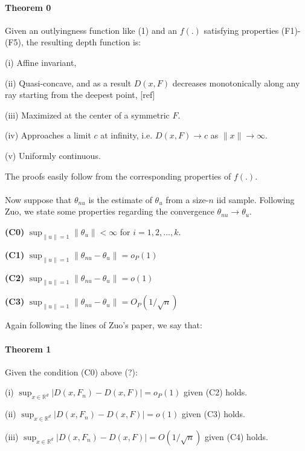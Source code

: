 \documentclass{article}
\begin{document}
\paragraph{Theorem 0} Given an outlyingness function like (1) and an $f(.)$ satisfying properties (F1)-(F5), the resulting depth function is:

(i) Affine invariant,

(ii) Quasi-concave, and as a result $D(x,F)$ decreases monotonically along any ray starting from the deepest point, [ref]

(iii) Maximized at the center of a symmetric $F$.

(iv) Approaches a limit $c$ at infinity, i.e. $D(x,F) \rightarrow c$ as $\|x\| \rightarrow \infty$.

(v) Uniformly continuous.
\vspace{.5cm}

The proofs easily follow from the corresponding properties of $f(.)$.

\paragraph{}Now suppose that $\theta_{nu}$ is the estimate of $\theta_u$ from a size-$n$ iid sample. Following Zuo, we state some properties regarding the convergence $\theta_{nu}\rightarrow\theta_u$.

\textbf{(C0)} $ \sup_{\|u\|=1} \|\theta_u\| < \infty$ for $i=1,2,...,k$.

\textbf{(C1)} $ \sup_{\|u\|=1} \|\theta_{nu}-\theta_u\| = o_P(1)$

\textbf{(C2)} $ \sup_{\|u\|=1} \|\theta_{nu}-\theta_u\| = o(1)$

\textbf{(C3)} $ \sup_{\|u\|=1} \|\theta_{nu}-\theta_u\| = O_P(1/\sqrt n)$
\vspace{.5cm}

Again following the lines of Zuo's paper, we say that:
\paragraph{Theorem 1} Given the condition (C0) above (?):

(i) $\sup_{x\in\mathbb{R}^d} |D(x,F_n)-D(x,F)| = o_P(1)$ given (C2) holds.

(ii) $\sup_{x\in\mathbb{R}^d} |D(x,F_n)-D(x,F)| = o(1)$ given (C3) holds.

(iii) $\sup_{x\in\mathbb{R}^d} |D(x,F_n)-D(x,F)| = O(1/ \sqrt n)$ given (C4) holds.
\end{document}
